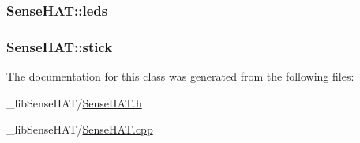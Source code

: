 \subsubsection[{\texorpdfstring{leds}{leds}}]{ Sense\+H\+A\+T\+::leds}\hypertarget{class_sense_h_a_t_a09557e42b20ddddc1763917bd36f36a7}{}\label{class_sense_h_a_t_a09557e42b20ddddc1763917bd36f36a7}
\subsubsection[{\texorpdfstring{stick}{stick}}]{ Sense\+H\+A\+T\+::stick}\hypertarget{class_sense_h_a_t_a69d5712bf0663364109f9a482178dc2c}{}\label{class_sense_h_a_t_a69d5712bf0663364109f9a482178dc2c}


The documentation for this class was generated from the following files\+:\begin{DoxyCompactItemize}
\item 
\+\_\+lib\+Sense\+H\+A\+T/\hyperlink{_sense_h_a_t_8h}{Sense\+H\+A\+T.\+h}\item 
\+\_\+lib\+Sense\+H\+A\+T/\hyperlink{_sense_h_a_t_8cpp}{Sense\+H\+A\+T.\+cpp}\end{DoxyCompactItemize}

